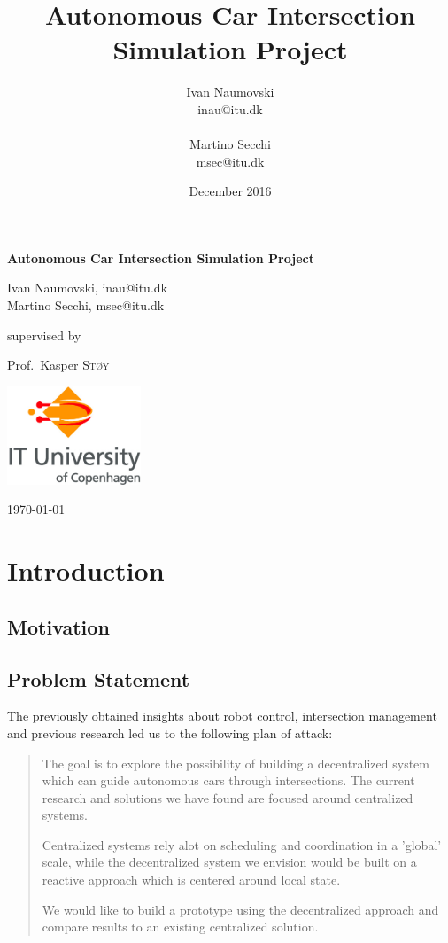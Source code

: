 \documentclass[titlepage]{article}
\title{Autonomous Car Intersection Simulation Project}
\author{
   Ivan Naumovski\\
    {inau@itu.dk}\\
    \\
   Martino Secchi\\
    {msec@itu.dk}\\
}
\date{December 2016}
\begin{document}
\begin{titlepage}
	\centering

	{\huge\bfseries Autonomous Car Intersection Simulation Project \par}
	\vspace{2cm}
	{\Large Ivan Naumovski, {inau@itu.dk}\\ Martino Secchi, {msec@itu.dk}\\\par}
	\vfill
	supervised by\par
	\large Prof.~Kasper \textsc{St\o y}

	\vfill
	\includegraphics[width=0.3\textwidth]{img/itulogo.jpg}\par\vspace{1cm}
	{\large \today\par}
\end{titlepage}

\clearpage
\tableofcontents
\clearpage


\abstract{

}
\section{Introduction}


\subsection{Motivation}


\subsection{Problem Statement}
The previously obtained insights about robot control, intersection management and previous research led us to the following plan of attack:

\begin{quotation}
The goal is to explore the possibility of building a decentralized system which can guide autonomous cars through intersections. 
The current research and solutions we have found are focused around centralized systems. 

Centralized systems rely alot on scheduling and coordination in a 'global' scale, 
while the decentralized system we envision would be built on a reactive approach which is centered around local state. 

We would like to build a prototype using the decentralized approach and compare results to an existing centralized solution.
\end{quotation}
\end{document}
